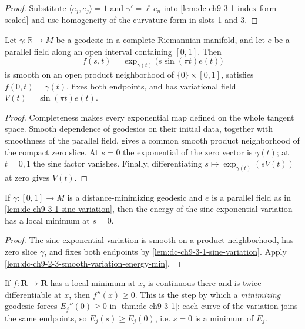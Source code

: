 \begin{proof}

  \sketch
  Substitute $\langle e_j,e_j\rangle=1$ and $\gamma'=\ell\,e_n$ into
  \cref{lem:dc-ch9-3-1-index-form-scaled} and use homogeneity of the curvature form in slots
  1 and 3.
\end{proof}
\begin{lemma}
  \label{lem:dc-ch9-3-1-sine-variation}


  Let $\gamma:\mathbb R\to M$ be a geodesic in a complete Riemannian
  manifold, and let $e$ be a parallel field along an open interval containing
  $[0,1]$. Then
  \[
    f(s,t)=\exp_{\gamma(t)}\!\bigl(s\sin(\pi t)e(t)\bigr)
  \]
  is smooth on an open product neighborhood of
  $\{0\}\times[0,1]$, satisfies $f(0,t)=\gamma(t)$, fixes both endpoints, and
  has variational field $V(t)=\sin(\pi t)e(t)$.
\end{lemma}
\begin{proof}

  \sketch
  Completeness makes every exponential map defined on the whole tangent
  space. Smooth dependence of geodesics on their initial data, together with
  smoothness of the parallel field, gives a common smooth product
  neighborhood of the compact zero slice. At $s=0$ the exponential of the
  zero vector is $\gamma(t)$; at $t=0,1$ the sine factor vanishes. Finally,
  differentiating $s\mapsto\exp_{\gamma(t)}(sV(t))$ at zero gives $V(t)$.
\end{proof}
\begin{lemma}
  \label{lem:dc-ch9-3-1-sine-energy-min}


  If $\gamma:[0,1]\to M$ is a distance-minimizing geodesic and $e$ is a
  parallel field as in \cref{lem:dc-ch9-3-1-sine-variation}, then the energy
  of the sine exponential variation has a local minimum at $s=0$.
\end{lemma}
\begin{proof}

  \sketch
  The sine exponential variation is smooth on a product neighborhood, has
  zero slice $\gamma$, and fixes both endpoints by
  \cref{lem:dc-ch9-3-1-sine-variation}. Apply
  \cref{lem:dc-ch9-2-3-smooth-variation-energy-min}.
\end{proof}
\begin{lemma}
  \label{lem:dc-ch9-3-1-second-order-min}


  If $f:\mathbf{R}\to\mathbf{R}$ has a local minimum at $x$, is continuous there and is twice
  differentiable at $x$, then $f''(x)\ge 0$. This is the step by which a \emph{minimizing}
  geodesic forces $E_j''(0)\ge 0$ in \cref{thm:dc-ch9-3-1}: each curve of the variation joins
  the same endpoints, so $E_j(s)\ge E_j(0)$, i.e. $s=0$ is a minimum of $E_j$.
\end{lemma}
